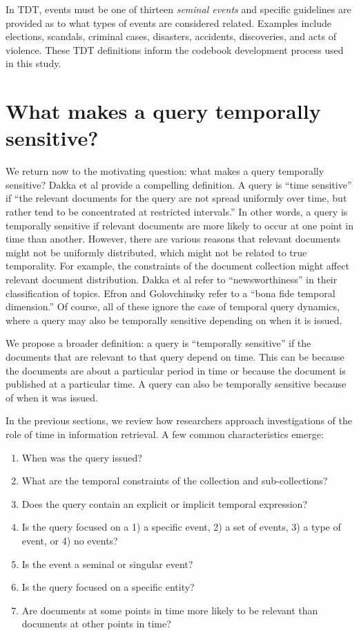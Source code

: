 \documentclass{sig-alternate}
\begin{document}
In TDT, events must be one of thirteen \emph{seminal events} and specific guidelines are provided as to what types of events are considered related. Examples include elections, scandals, criminal cases, disasters, accidents, discoveries, and acts of violence. These TDT definitions inform the codebook development process used in this study.

\section{What makes a query temporally sensitive?}

We return now to the motivating question: what makes a query temporally sensitive? Dakka et al provide a compelling definition. A query is ``time sensitive''  if  ``the relevant documents for the query are not spread uniformly over time, but rather tend to be concentrated at restricted intervals.'' In other words, a query is temporally sensitive if relevant documents are more likely to occur at one point in time than another. However, there are various reasons that relevant documents might not be uniformly distributed, which might not be related to true temporality.  For example, the constraints of the document collection might affect relevant document distribution.  Dakka et al refer to ``newsworthiness'' in their classification of topics.  Efron and Golovchinsky refer to a ``bona fide temporal dimension.'' Of course, all of these ignore the case of temporal query dynamics, where a query may also be temporally sensitive depending on when it is issued.

We propose a broader definition: a query is ``temporally sensitive'' if the documents that are relevant to that query depend on time. This can be because the documents are about a particular period in time or because the document is published at a particular time. A query can also be temporally sensitive because of when it was issued. 

In the previous sections, we review how researchers approach investigations of the role of time in information retrieval. A few common characteristics emerge:

\begin{enumerate}
\item When was the query issued?
\item What are the temporal constraints of the collection and sub-collections?
\item Does the query contain an explicit or implicit temporal expression?
\item Is the query focused on a 1) a specific event, 2) a set of events, 3) a type of event, or 4) no events?
\item Is the event a seminal or singular event?
\item Is the query focused on a specific entity?
\item Are documents at some points in time more likely to be relevant than documents at other points in time?
\end{enumerate}
\end{document}
